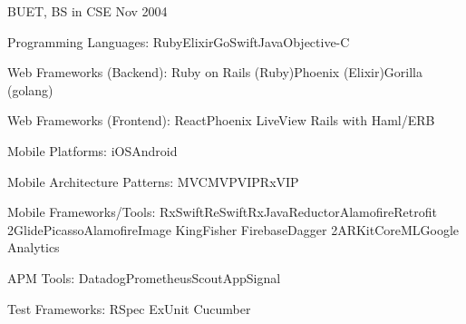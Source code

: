 \documentclass[10pt,a4paper]{article} %
\begin{document}
\headedsubsection %
{BUET, BS in CSE}
{Nov 2004}
{}



\inlineheadsection %
{Programming Languages:}
{Ruby\bull Elixir\bull Go\bull Swift\bull Java\bull Objective-C}

\inlineheadsection %
{Web Frameworks (Backend):}
{Ruby on Rails (Ruby)\bull Phoenix (Elixir)\bull Gorilla (golang)}

\inlineheadsection %
{Web Frameworks (Frontend):}
{React\bull Phoenix LiveView \bull Rails with Haml/ERB}

\inlineheadsection %
{Mobile Platforms:}
{iOS\bull Android}

\inlineheadsection %
{Mobile Architecture Patterns:}
{MVC\bull MVP\bull VIP\bull RxVIP}

\inlineheadsection %
{Mobile Frameworks/Tools:}
{RxSwift\bull ReSwift\bull RxJava\bull Reductor\bull Alamofire\bull Retrofit 2\bull Glide\bull Picasso\bull AlamofireImage \bull KingFisher
\bull Firebase\bull Dagger 2\bull ARKit\bull CoreML\bull Google Analytics}

\inlineheadsection %
{APM Tools:}
{Datadog\bull Prometheus\bull Scout\bull AppSignal}

\inlineheadsection %
{Test Frameworks:}
{RSpec \bull ExUnit \bull Cucumber}
\end{document}
